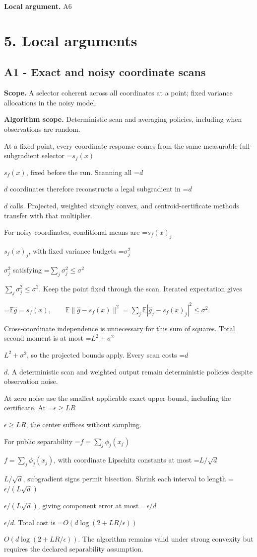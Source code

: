\documentclass[10pt,a4paper]{article}
\newcommand{\AtlasMath}[1]{\par\begingroup\centering\setbox0=\hbox{$\displaystyle #1$}\ifdim\wd0>1.4\linewidth\typeout{ATLAS WIDE FORMULA: \the\wd0}\fi\ifdim\wd0>\linewidth\resizebox{\linewidth}{!}{\box0}\else\box0\fi\par\endgroup}
\newcommand{\AtlasInlineMath}[1]{\begingroup\setbox0=\hbox{$#1$}\ifdim\wd0>.4\linewidth\endgroup\AtlasMath{#1}\else\endgroup$#1$\fi}
\begin{document}
\textbf{Local argument.} A6

\section{5. Local arguments}
\subsection{A1 - Exact and noisy coordinate scans}
\textbf{Scope.} A selector coherent across all coordinates at a point; fixed variance allocations in the noisy model.

\textbf{Algorithm scope.} Deterministic scan and averaging policies, including when observations are random.

At a fixed point, every coordinate response comes from the same measurable full-subgradient selector \AtlasInlineMath{s_f(x)}, fixed before the run. Scanning all \AtlasInlineMath{d} coordinates therefore reconstructs a legal subgradient in \AtlasInlineMath{d} calls. Projected, weighted strongly convex, and centroid-certificate methods transfer with that multiplier.

For noisy coordinates, conditional means are \AtlasInlineMath{s_f(x)_j}, with fixed variance budgets \AtlasInlineMath{\sigma_j^2} satisfying \AtlasInlineMath{\sum_j\sigma_j^2\le\sigma^2}. Keep the point fixed through the scan. Iterated expectation gives

\AtlasMath{\mathbb E\widehat g=s_f(x),\qquad
\mathbb E\|\widehat g-s_f(x)\|^2
=\sum_j\mathbb E|\widehat g_j-s_f(x)_j|^2\le\sigma^2.}

Cross-coordinate independence is unnecessary for this sum of squares. Total second moment is at most \AtlasInlineMath{L^2+\sigma^2}, so the projected bounds apply. Every scan costs \AtlasInlineMath{d}. A deterministic scan and weighted output remain deterministic policies despite observation noise.

At zero noise use the smallest applicable exact upper bound, including the certificate. At \AtlasInlineMath{\epsilon\ge LR}, the center suffices without sampling.

For public separability \AtlasInlineMath{f=\sum_j\phi_j(x_j)}, with coordinate Lipschitz constants at most \AtlasInlineMath{L/\sqrt d}, subgradient signs permit bisection. Shrink each interval to length \AtlasInlineMath{\epsilon/(L\sqrt d)}, giving component error at most \AtlasInlineMath{\epsilon/d}. Total cost is \AtlasInlineMath{O(d\log(2+LR/\epsilon))}. The algorithm remains valid under strong convexity but requires the declared separability assumption.
\end{document}
